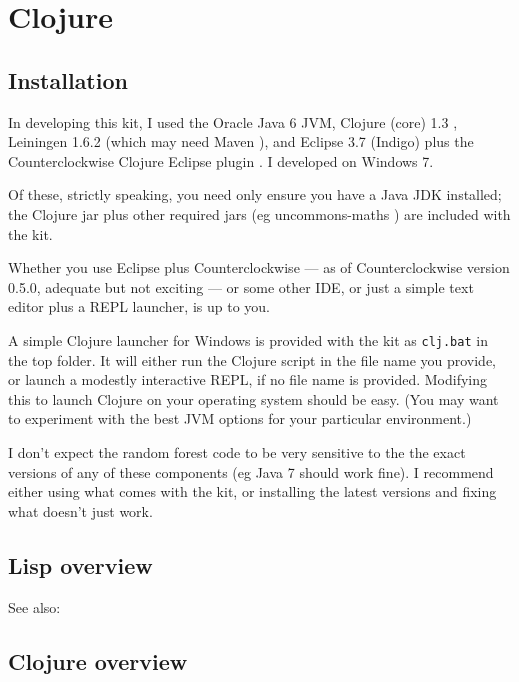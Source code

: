 \documentclass[11pt,openany,american,usenames,dvipsnames,svgnames,x11names,table,isodate]{article}
\numberwithin{equation}{section}
\numberwithin{figure}{section}
\begin{document}
\appendix



\section{\label{sec:Clojure}Clojure}


\subsection{Installation}

In developing this kit, I used the Oracle Java 6 JVM\cite{java6-2012},
Clojure (core) 1.3 \cite{clojure-2012}, Leiningen 1.6.2\cite{leinigen-2012}
(which may need Maven \cite{maven-2012}), and Eclipse 3.7 (Indigo)
plus the Counterclockwise Clojure Eclipse plugin \cite{counterclockwise-2012}.
I developed on Windows 7.

Of these, strictly speaking, you need only ensure you have a Java
JDK installed; the Clojure jar plus other required jars (eg uncommons-maths
\cite{uncommons-maths-2012}) are included with the kit. 

Whether you use Eclipse plus Counterclockwise --- as of Counterclockwise
version 0.5.0, adequate but not exciting --- or some other IDE, or
just a simple text editor plus a REPL launcher, is up to you. 

A simple Clojure launcher for Windows is provided with the kit as
\texttt{clj.bat} in the top folder. It will either run the Clojure
script in the file name you provide, or launch a modestly interactive
REPL, if no file name is provided. Modifying this to launch Clojure
on your operating system should be easy. (You may want to experiment
with the best JVM options for your particular environment.)

I don't expect the random forest code to be very sensitive to the
the exact versions of any of these components (eg Java 7 should work
fine). I recommend either using what comes with the kit, or installing
the latest versions and fixing what doesn't just work.


\subsection{Lisp overview}

See also: \cite{steele-cltl2-1990,kiczales-metaobject-protocol-1991,dylan1992,norvig1992paradigms,abelson1996sicp}


\subsection{Clojure overview}
\end{document}
